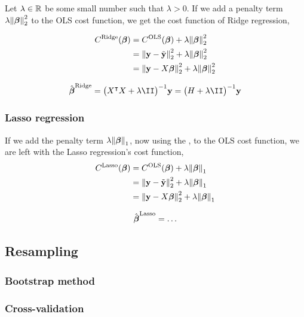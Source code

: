 Let $\lambda \in \mathbb{R}^{}$ be some small number such that $\lambda >0$. If we add a penalty term $\lambda \norm{\boldsymbol{\beta}}_2^2$ to the OLS cost function, we get the cost function of Ridge regression,

\begin{align*}
    C^\text{Ridge}(\boldsymbol{\beta}) &=  C^\text{OLS}(\boldsymbol{\beta}) + \lambda \norm{\boldsymbol{\beta}}_2^2 \\
    &=\norm{\mathbf{y}-\tilde{\mathbf{y}}}_2^{2}  + \lambda \norm{\boldsymbol{\beta}}_2^2 \\
    &= \norm{\mathbf{y}-X\boldsymbol{\beta}}_2^{2} + \lambda \norm{\boldsymbol{\beta}}_2^2 
\end{align*}

\begin{align*}
    \optbeta^\text{Ridge} = \big(\hessian + \lambda \II\big)^{-1} \vec{y} = \big(H + \lambda \II\big)^{-1} \vec{y}
\end{align*}


\subsubsection{Lasso regression}\label{sec:Lasso}

If we add the penalty term $\lambda \norm{\boldsymbol{\beta}}_1$, now using the , to the OLS cost function, we are left with the Lasso regression's cost function,
\begin{align*}
    C^\text{Lasso}(\boldsymbol{\beta})  &= C^\text{OLS}(\boldsymbol{\beta}) + \lambda \norm{\boldsymbol{\beta}}_1 \\
    &= \norm{\mathbf{y}-\tilde{\mathbf{y}}}_2^{2}  + \lambda \norm{\boldsymbol{\beta}}_{1} \\
    &= \norm{\mathbf{y}-X\boldsymbol{\beta}}_2^{2} + \lambda \norm{\boldsymbol{\beta}}_{1}
\end{align*}

\begin{align*}
    \hat{\boldsymbol{\beta}}^\text{Lasso} = \dots
\end{align*}

\subsection{Resampling}\label{sec:resampling}

\subsubsection{Bootstrap method}\label{sec:bootstrap}

\subsubsection{Cross-validation}\label{sec:k_fold}

